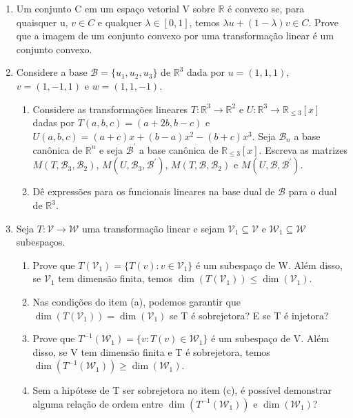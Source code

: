 \documentclass{article}
\begin{document}
\begin{enumerate}
    \item Um conjunto C em um espaço vetorial V sobre $\mathbb{R}$ é convexo se, para quaisquer u, $v\in C$ e qualquer $\lambda\in[0,1]$, temos $\lambda u+(1-\lambda)v\in C$. Prove que a imagem de um conjunto convexo por uma transformação linear é um conjunto convexo.
    
    \item Considere a base $\mathcal{B}=\{u_{1},u_{2},u_{3}\}$ de $\mathbb{R}^{3}$ dada por $u=(1,1,1)$, $v=(1,-1,1)$ e $w=(1,1,-1)$.
    \begin{enumerate}
        \item[(a)] Considere as transformações lineares $T:\mathbb{R}^{3}\rightarrow\mathbb{R}^{2}$ e $U:\mathbb{R}^{3}\rightarrow\mathbb{R}_{\le3}[x]$ dadas por $T(a,b,c) = (a+2b,b-c)$ e $U(a,b,c) = (a+c)x + (b-a)x^2 - (b+c)x^3$. Seja $\mathcal{B}_{n}$ a base canônica de $\mathbb{R}^{n}$ e seja $\mathcal{B}^{\prime}$ a base canônica de $\mathbb{R}_{\le3}[x]$. 
        Escreva as matrizes $M(T,\mathcal{B}_{3},\mathcal{B}_{2})$, $M(U,\mathcal{B}_{3},\mathcal{B}^{\prime})$, $M(T,\mathcal{B},\mathcal{B}_{2})$ e $M(U,\mathcal{B},\mathcal{B}^{\prime})$.
        \item[(b)] Dê expressões para os funcionais lineares na base dual de $\mathcal{B}$ para o dual de $\mathbb{R}^{3}$.
    \end{enumerate}
    
    \item Seja $T:\mathcal{V}\rightarrow\mathcal{W}$ uma transformação linear e sejam $\mathcal{V}_{1}\subseteq\mathcal{V}$ e $\mathcal{W}_{1}\subseteq\mathcal{W}$ subespaços.
    \begin{enumerate}
        \item[(a)] Prove que $T(\mathcal{V}_{1})=\{T(v):v\in\mathcal{V}_{1}\}$ é um subespaço de W. Além disso, se $\mathcal{V}_{1}$ tem dimensão finita, temos $\dim(T(\mathcal{V}_{1}))\le \dim(\mathcal{V}_{1})$.
        \item[(b)] Nas condições do item (a), podemos garantir que $\dim(T(\mathcal{V}_{1}))=\dim(\mathcal{V}_{1})$ se T é sobrejetora? E se T é injetora?
        \item[(c)] Prove que $T^{-1}(\mathcal{W}_{1})=\{v:T(v)\in\mathcal{W}_{1}\}$ é um subespaço de V. Além disso, se V tem dimensão finita e T é sobrejetora, temos $\dim(T^{-1}(\mathcal{W}_{1}))\ge \dim(\mathcal{W}_{1})$.
        \item[(d)] Sem a hipótese de T ser sobrejetora no item (c), é possível demonstrar alguma relação de ordem entre $\dim(T^{-1}(\mathcal{W}_{1}))$ e $\dim(\mathcal{W}_{1})$?
    \end{enumerate}
    

\end{enumerate}
\end{document}
